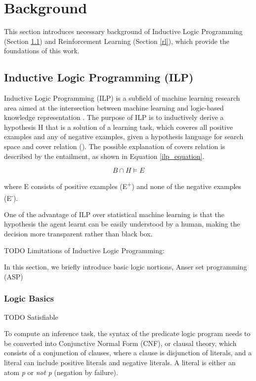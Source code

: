 \documentclass[12pt,twoside]{report}
\begin{document}
\chapter{Background}
\label{background}

This section introduces necessary background of Inductive Logic Programming (Section \ref{ilp}) and Reinforcement Learning (Section \ref{rl}), which provide the foundations of this work.

\section{Inductive Logic Programming (ILP)}
\label{ilp}

Inductive Logic Programming (ILP) is a subfield of machine learning research area aimed at the intersection between machine learning and logic-based knowledge representation \cite{Muggleton1991}. The purpose of ILP is to inductively derive a hypothesis H that is a solution of a learning task, which coveres all positive examples and any of negative examples, given a hypothesis language for search space and cover relation (\cite{DeRaedt1997}). The possible explanation of covers relation is described by the entailment, as shown in Equation \ref{ilp_equation}. 

\begin{equation}
B \cap H \models E
\end{equation}
\label{ilp_equation}

where E consists of positive examples (E\textsuperscript{+}) and none of the negative examples (E\textsuperscript{-}). 

One of the advantage of ILP over statistical machine learning is that the hypothesis the agent learnt can be easily understood by a human, making the decision more transparent rather than black box.


TODO Limitations of Inductive Logic Programming:

In this section, we briefly introduce basic logic nortions, Anser set programming (ASP)

\subsection{Logic Basics}

TODO Satisfiable

To compute an inference task, the syntax of the predicate logic program needs to be converted into Conjunctive Normal Form (CNF), or clausal theory, which consists of a conjunction of clauses, where a clause is disjunction of literals, and a literal can include positive literals and negative literals. A literal is either an atom \textit{p} or \textit{not p} (negation by failure).
\end{document}
